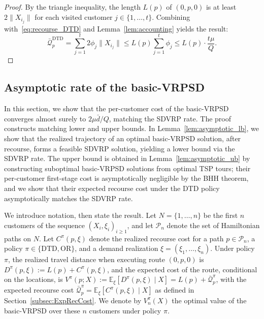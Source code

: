 \documentclass{article}
\begin{document}
{\begin{proof}
    By the triangle inequality, the length $L(p)$ of $(0,p,0)$ is at least $2\|X_{i_j}\|$ for each visited customer $j \in \{1, \dots, t\}$.  Combining with~\eqref{eq:recourse_DTD} and Lemma~\ref{lem:accounting} yields the result:
    \begin{equation*}
\bar{\mathcal{Q}}^{\text{DTD}}_p = \sum_{j=1}^t 2\phi_j \|X_{i_j}\| \leq L(p) \sum_{j=1}^t \phi_j \leq L(p) \cdot \frac{t\mu}{Q}.
\end{equation*}\end{proof}


\subsection{Asymptotic rate of the basic-VRPSD}\label{sec:asymptotics:main}

In this section, we show that the per-customer cost of the basic-VRPSD converges almost surely to $2\mu\bar d/Q$, matching the SDVRP rate. The proof constructs matching lower and upper bounds. In Lemma~\ref{lem:asymptotic_lb}, we show that the realized trajectory of an optimal basic-VRPSD solution, after recourse, forms a feasible SDVRP solution, yielding a lower bound via the SDVRP rate. The upper bound is obtained in Lemma~\ref{lem:asymptotic_ub} by constructing suboptimal basic-VRPSD solutions from optimal TSP tours; their per-customer first-stage cost is asymptotically negligible by the BHH theorem, and we show that their expected recourse cost under the DTD policy asymptotically matches the SDVRP rate.

We introduce notation, then state the result. Let $N = \{1,\dots,n\}$ be the first $n$ customers of the sequence $(X_i,\xi_i)_{i\ge1}$, and let $\mathcal P_n$ denote the set of Hamiltonian paths on $N$. Let $C^{\pi}(p, \xi)$ denote the realized recourse cost for a path $p \in \mathcal{P}_n$, a policy $\pi \in \{\text{DTD}, \text{OR}\}$, and a demand realization $\xi = (\xi_1, \dots, \xi_n)$. Under policy $\pi$, the realized travel distance when executing route $(0, p, 0)$ is $D^{\pi}(p, \xi) := L(p) + C^{\pi}(p, \xi)$, and the expected cost of the route, conditional on the locations, is $V^{\pi}(p; X) := \mathbb{E}_{\xi}\!\left[D^{\pi}(p, \xi) \mid X\right] = L(p) + \bar{\mathcal{Q}}^{\pi}_p$, with the expected recourse cost $\bar{\mathcal{Q}}^{\pi}_p = \mathbb{E}_\xi[C^{\pi}(p, \xi) \mid X]$ as defined in Section~\ref{subsec:ExpRecCost}. We denote by $V^{\pi}_n(X)$ the optimal value of the basic-VRPSD over these $n$ customers under policy $\pi$.

}
\end{document}
